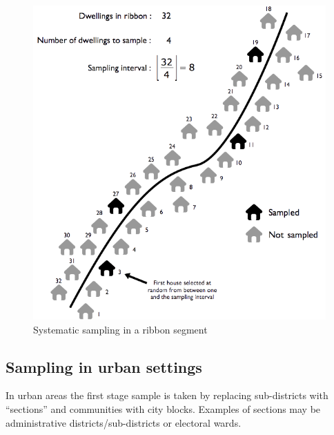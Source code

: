\documentclass[12pt,a4paper]{book}
\theoremstyle{definition}
\theoremstyle{definition}
\theoremstyle{definition}
\theoremstyle{remark}
\begin{document}
\begin{figure}[H]

{\centering \includegraphics[width=8.38in]{figures/stage2sample9} 

}

\caption{Systematic sampling in a ribbon segment}\label{fig:sample23}
\end{figure}

\hypertarget{sampling-in-urban-settings}{%
\subsection{Sampling in urban
settings}\label{sampling-in-urban-settings}}

In urban areas the first stage sample is taken by replacing
sub-districts with ``sections'' and communities with city blocks.
Examples of sections may be administrative districts/sub-districts or
electoral wards.
\end{document}
